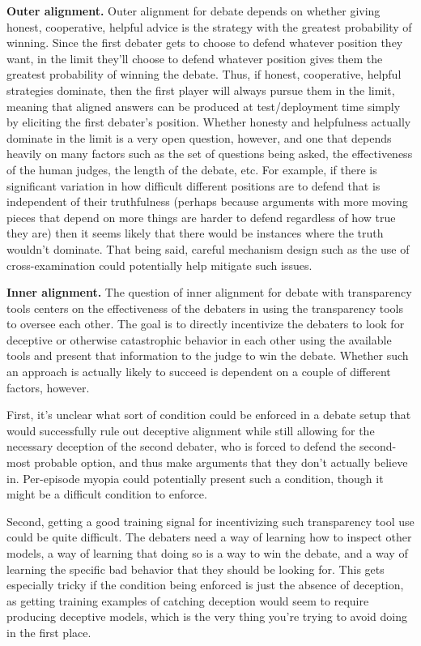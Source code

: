 \documentclass[
  onecolumn,
  natbib,
]{miri-tech-article}
\begin{document}
\textbf{Outer alignment.} Outer alignment for debate depends on whether giving honest, cooperative, helpful advice is the strategy with the greatest probability of winning. Since the first debater gets to choose to defend whatever position they want, in the limit they'll choose to defend whatever position gives them the greatest probability of winning the debate. Thus, if honest, cooperative, helpful strategies dominate, then the first player will always pursue them in the limit, meaning that aligned answers can be produced at test/deployment time simply by eliciting the first debater's position. Whether honesty and helpfulness actually dominate in the limit is a very open question, however, and one that depends heavily on many factors such as the set of questions being asked, the effectiveness of the human judges, the length of the debate, etc. For example, if there is significant variation in how difficult different positions are to defend that is independent of their truthfulness (perhaps because arguments with more moving pieces that depend on more things are harder to defend regardless of how true they are) then it seems likely that there would be instances where the truth wouldn't dominate. That being said, careful mechanism design such as the use of cross-examination could potentially help mitigate such issues.

\textbf{Inner alignment.} The question of inner alignment for debate with transparency tools centers on the effectiveness of the debaters in using the transparency tools to oversee each other. The goal is to directly incentivize the debaters to look for deceptive or otherwise catastrophic behavior in each other using the available tools and present that information to the judge to win the debate. Whether such an approach is actually likely to succeed is dependent on a couple of different factors, however.

First, it's unclear what sort of condition could be enforced in a debate setup that would successfully rule out deceptive alignment\cite{TODO: cite https://www.alignmentforum.org/posts/zthDPAjh9w6Ytbeks/deceptive-alignment} while still allowing for the necessary deception of the second debater, who is forced to defend the second-most probable option, and thus make arguments that they don't actually believe in. Per-episode myopia could potentially present such a condition, though it might be a difficult condition to enforce.

Second, getting a good training signal for incentivizing such transparency tool use could be quite difficult. The debaters need a way of learning how to inspect other models, a way of learning that doing so is a way to win the debate, and a way of learning the specific bad behavior that they should be looking for. This gets especially tricky if the condition being enforced is just the absence of deception, as getting training examples of catching deception would seem to require producing deceptive models, which is the very thing you're trying to avoid doing in the first place.
\end{document}
